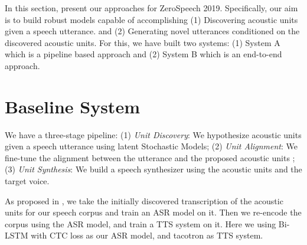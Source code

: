 In this section, present our approaches for ZeroSpeech 2019. Specifically, our aim is to build robust models capable of accomplishing (1) Discovering acoustic units given a speech utterance. and (2) Generating novel utterances conditioned on the discovered acoustic units. For this, we have built two systems: (1) System A which is a pipeline based approach and (2) System B which is an end-to-end approach. 
\fi 

\section{Baseline System}

We have a three-stage pipeline: (1) \textit{Unit Discovery}: We hypothesize acoustic units given a speech utterance using latent Stochastic Models; (2) \textit{Unit Alignment}: We fine-tune the alignment between the utterance and the proposed acoustic units ; (3) \textit{Unit Synthesis}: We build a speech synthesizer using the acoustic units and the target voice.




As proposed in \citep{sitaram2013bootstrapping}, we take the initially discovered transcription of the acoustic units for our speech corpus and train an ASR model on it. Then we re-encode the corpus using the ASR model, and train a TTS system on it. Here we using Bi-LSTM with CTC loss as our ASR model, and tacotron \citep{tacotron_transferlearning2multispeaker} as TTS system. 



